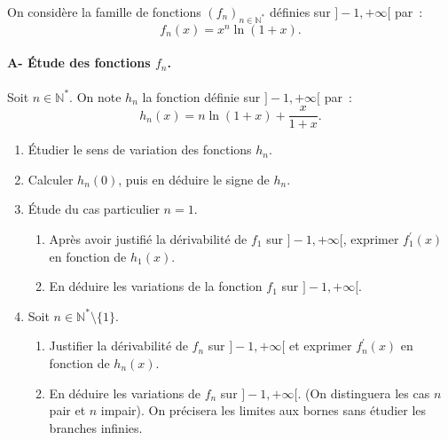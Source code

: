 \begin{exercice}



On consid\`ere la famille de fonctions $(f_n)_{n\in\mathbb{N}^*}$ d\'efinies
sur $]-1,+\infty[$ par~: 
\begin{equation*}
f_n(x)=x^n\ln (1+x).
\end{equation*}


\paragraph{A- \'Etude des fonctions $f_n$.\\}




Soit $n\in \mathbb{N}^*$. On note $h_n$ la fonction d\'efinie sur $%
]-1,+\infty[$ par~: 
\begin{equation*}
h_n(x)=n\ln(1+x)+\frac{x}{1+x}.
\end{equation*}

\begin{enumerate}
\item \'{E}tudier le sens de variation des fonctions $h_{n}$.

\item Calculer $h_{n}(0)$, puis en d\'{e}duire le signe de $h_{n}$.

\item \'{E}tude du cas particulier $n=1$.

\begin{enumerate}
\item Apr\`{e}s avoir justifi\'{e} la d\'{e}rivabilit\'{e} de $f_{1}$ sur $%
]-1,+\infty [$, exprimer $f_{1}^{\prime }(x)$ en fonction de $h_{1}(x)$.

\item En d\'{e}duire les variations de la fonction $f_{1}$ sur $]-1,+\infty
[ $.
\end{enumerate}

\item Soit $n\in \mathbb{N}^{*}\setminus \{1\}$.

\begin{enumerate}
\item Justifier la d\'{e}rivabilit\'{e} de $f_{n}$ sur $]-1,+\infty [$ et
exprimer $f_{n}^{\prime }(x)$ en fonction de $h_{n}(x)$.

\item En d\'{e}duire les variations de $f_{n}$ sur $]-1,+\infty [$. (On
distinguera les cas $n$ pair et $n$ impair). On pr\'{e}cisera les limites
aux bornes sans \'{e}tudier les branches infinies.
\end{enumerate}
\end{enumerate}


\end{exercice}
